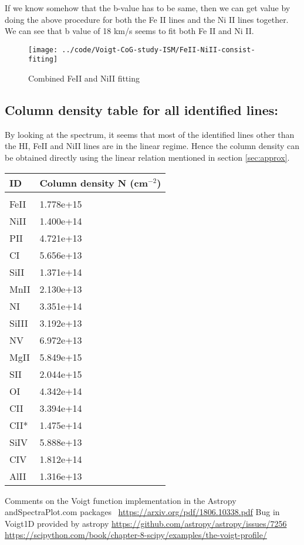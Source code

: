 \documentclass[12pt]{article}
\begin{document}
\newpage

If we know somehow that the b-value has to be same, then we can get value by doing the above procedure for both the Fe II lines and the Ni II lines together. We can see that b value of 18 km/s  seems to fit both Fe II and Ni II.

\begin{figure}[H]
	\centering
	\texttt{[image: ../code/Voigt-CoG-study-ISM/FeII-NiII-consist-fiting]}
	\caption{Combined FeII and NiII fitting}
	\label{fig:feii-niii-consist-fiting}
\end{figure}

\newpage

\subsection{Column density table for all identified lines:}
By looking at the spectrum, it seems that most of the identified lines other than the HI, FeII and NiII lines are in the linear regime. Hence the column density can be obtained directly using the linear relation mentioned in section \ref{sec:approx}.
\begin{table}[H]
\begin{tabular}{l|l}
ID & Column density N (cm$^{-2}$)\\
\hline & \\
FeII  & 1.778e+15 \\
NiII  & 1.400e+14 \\
PII   & 4.721e+13 \\
CI    & 5.656e+13 \\
SiII  & 1.371e+14 \\
MnII  & 2.130e+13 \\
NI    & 3.351e+14 \\
SiIII & 3.192e+13 \\
NV    & 6.972e+13 \\
MgII  & 5.849e+15 \\
SII   & 2.044e+15 \\
OI    & 4.342e+14 \\
CII   & 3.394e+14 \\
CII*  & 1.475e+14 \\
SiIV  & 5.888e+13 \\
CIV   & 1.812e+14 \\
AlII  & 1.316e+13
\end{tabular}
\end{table}


 


%
\begin{thebibliography}{8}
	Comments on the Voigt function implementation in the Astropy andSpectraPlot.com packages ~\url{https://arxiv.org/pdf/1806.10338.pdf}
	Bug in Voigt1D provided by astropy
	\url{https://github.com/astropy/astropy/issues/7256}
	\url{https://scipython.com/book/chapter-8-scipy/examples/the-voigt-profile/}
\end{thebibliography}
\end{document}

